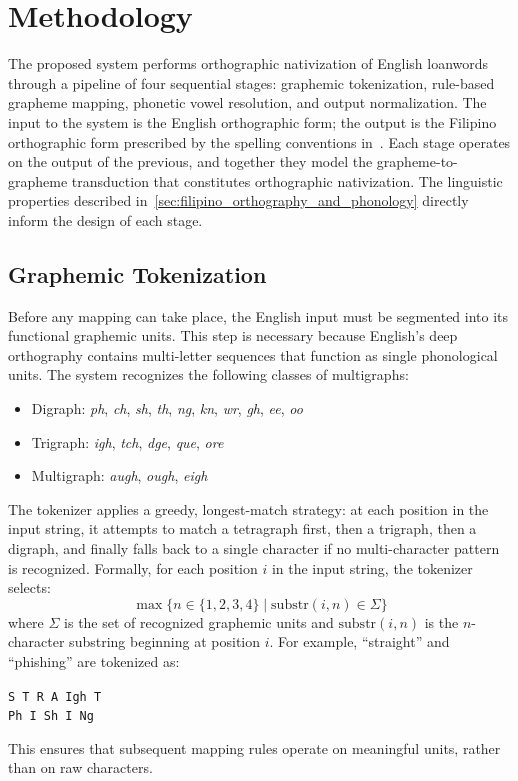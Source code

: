 \section{Methodology}
The proposed system performs orthographic nativization of English loanwords
through a pipeline of four sequential stages: graphemic tokenization,
rule-based grapheme mapping, phonetic vowel resolution, and output
normalization. The input to the system is the English orthographic form; the
output is the Filipino orthographic form prescribed by the spelling conventions
in~\cite{almario2014}. Each stage operates on the output of the previous, and
together they model the grapheme-to-grapheme transduction that constitutes
orthographic nativization. The linguistic properties described
in~\cref{sec:filipino_orthography_and_phonology} directly inform the design of
each stage.

\subsection{Graphemic Tokenization}
Before any mapping can take place, the English input must be segmented into its
functional graphemic units. This step is necessary because English's deep
orthography contains multi-letter sequences that function as
single phonological units. The system recognizes the following classes of
multigraphs:
\begin{itemize}
      \item Digraph: \emph{ph}, \emph{ch}, \emph{sh}, \emph{th},
            \emph{ng}, \emph{kn}, \emph{wr}, \emph{gh}, \emph{ee}, \emph{oo}
      \item Trigraph: \emph{igh}, \emph{tch}, \emph{dge},
            \emph{que}, \emph{ore}
      \item Multigraph: \emph{augh}, \emph{ough},
            \emph{eigh}
\end{itemize}

The tokenizer applies a greedy, longest-match strategy: at each position in the
input string, it attempts to match a tetragraph first, then a trigraph, then a
digraph, and finally falls back to a single character if no multi-character
pattern is recognized. Formally, for each position \(i\) in the input string,
the tokenizer selects:
\[
      \max \{n\in\{1,2,3,4\} \mid \mathrm{substr}(i,n) \in \Sigma\}
\]
where \(\Sigma\) is the set of recognized graphemic units and
\(\text{substr}(i, n)\) is the \(n\)-character substring beginning at position
\(i\). For example, ``straight'' and ``phishing'' are tokenized as:
\begin{center}
    \texttt{S~T~R~A~Igh~T} \\
    \texttt{Ph~I~Sh~I~Ng}
\end{center}
This ensures that subsequent mapping rules operate on meaningful
units, rather than on raw characters.
 
